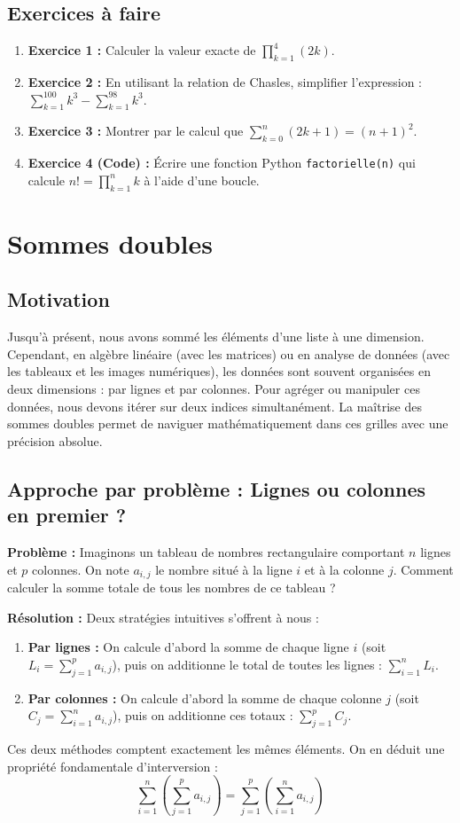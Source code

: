 \subsection{Exercices à faire}
\begin{enumerate}
    \item \textbf{Exercice 1 :} Calculer la valeur exacte de $\prod_{k=1}^{4} (2k)$.
    \item \textbf{Exercice 2 :} En utilisant la relation de Chasles, simplifier l'expression : $\sum_{k=1}^{100} k^3 - \sum_{k=1}^{98} k^3$.
    \item \textbf{Exercice 3 :} Montrer par le calcul que $\sum_{k=0}^{n} (2k+1) = (n+1)^2$.
    \item \textbf{Exercice 4 (Code) :} Écrire une fonction Python \texttt{factorielle(n)} qui calcule $n! = \prod_{k=1}^{n} k$ à l'aide d'une boucle.
\end{enumerate}

\section{Sommes doubles}

\subsection{Motivation}
Jusqu'à présent, nous avons sommé les éléments d'une liste à une dimension. Cependant, en algèbre linéaire (avec les matrices) ou en analyse de données (avec les tableaux et les images numériques), les données sont souvent organisées en deux dimensions : par lignes et par colonnes. Pour agréger ou manipuler ces données, nous devons itérer sur deux indices simultanément. La maîtrise des sommes doubles permet de naviguer mathématiquement dans ces grilles avec une précision absolue.

\subsection{Approche par problème : Lignes ou colonnes en premier ?}
\textbf{Problème :} Imaginons un tableau de nombres rectangulaire comportant $n$ lignes et $p$ colonnes. On note $a_{i,j}$ le nombre situé à la ligne $i$ et à la colonne $j$. Comment calculer la somme totale de tous les nombres de ce tableau ?

\textbf{Résolution :} Deux stratégies intuitives s'offrent à nous :
\begin{enumerate}
    \item \textbf{Par lignes :} On calcule d'abord la somme de chaque ligne $i$ (soit $L_i = \sum_{j=1}^{p} a_{i,j}$), puis on additionne le total de toutes les lignes : $\sum_{i=1}^{n} L_i$.
    \item \textbf{Par colonnes :} On calcule d'abord la somme de chaque colonne $j$ (soit $C_j = \sum_{i=1}^{n} a_{i,j}$), puis on additionne ces totaux : $\sum_{j=1}^{p} C_j$.
\end{enumerate}
Ces deux méthodes comptent exactement les mêmes éléments. On en déduit une propriété fondamentale d'interversion :
\[ \sum_{i=1}^{n} \left( \sum_{j=1}^{p} a_{i,j} \right) = \sum_{j=1}^{p} \left( \sum_{i=1}^{n} a_{i,j} \right) \]

